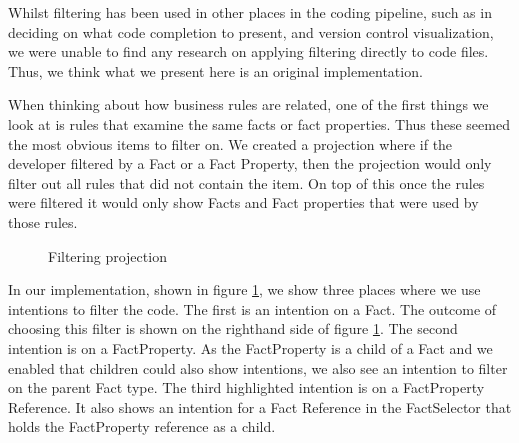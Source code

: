 Whilst filtering has been used in other places in the coding pipeline, such as in deciding on what code completion to present\cite{hou2010towards}, and version control visualization\cite{yoon2013visualization}, we were unable to find any research on applying filtering directly to code files.
Thus, we think what we present here is an original implementation.

When thinking about how business rules are related, one of the first things we look at is rules that examine the same facts or fact properties.
Thus these seemed the most obvious items to filter on.
We created a projection where if the developer filtered by a Fact or a Fact Property, then the projection would only filter out all rules that did not contain the item.
On top of this once the rules were filtered it would only show Facts and Fact properties that were used by those rules.

\begin{figure}[h]
    \centering
    \caption{Filtering projection}
    \label{fig:filteringProjection}
\end{figure}

In our implementation, shown in figure \ref{fig:filteringProjection}, we show three places where we use intentions to filter the code.
The first is an intention on a Fact.
The outcome of choosing this filter is shown on the righthand side of figure \ref{fig:filteringProjection}.
The second intention is on a FactProperty.
As the FactProperty is a child of a Fact and we enabled that children could also show intentions, we also see an intention to filter on the parent Fact type.
The third highlighted intention is on a FactProperty Reference.
It also shows an intention for a Fact Reference in the FactSelector that holds the FactProperty reference as a child.

